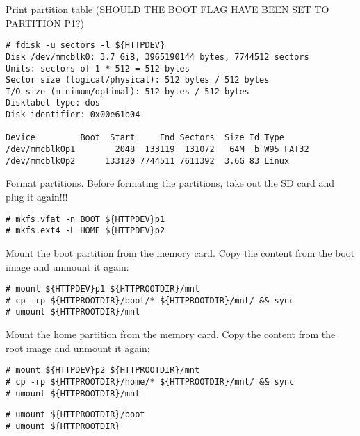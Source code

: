 Print partition table (SHOULD THE BOOT FLAG HAVE BEEN SET TO PARTITION P1?)
\begin{lstlisting}[]
# fdisk -u sectors -l ${HTTPDEV}
Disk /dev/mmcblk0: 3.7 GiB, 3965190144 bytes, 7744512 sectors
Units: sectors of 1 * 512 = 512 bytes
Sector size (logical/physical): 512 bytes / 512 bytes
I/O size (minimum/optimal): 512 bytes / 512 bytes
Disklabel type: dos
Disk identifier: 0x00e61b04

Device         Boot  Start     End Sectors  Size Id Type
/dev/mmcblk0p1        2048  133119  131072   64M  b W95 FAT32
/dev/mmcblk0p2      133120 7744511 7611392  3.6G 83 Linux
\end{lstlisting}
\FloatBarrier
\vspace{-5mm}

Format partitions. Before formating the partitions, take out the SD card
and plug it again!!!
\begin{lstlisting}[]
# mkfs.vfat -n BOOT ${HTTPDEV}p1
# mkfs.ext4 -L HOME ${HTTPDEV}p2
\end{lstlisting}
\FloatBarrier
\vspace{-5mm}

Mount the boot partition from the memory card. Copy the content from the
boot image and unmount it again:
\begin{lstlisting}[]
# mount ${HTTPDEV}p1 ${HTTPROOTDIR}/mnt
# cp -rp ${HTTPROOTDIR}/boot/* ${HTTPROOTDIR}/mnt/ && sync
# umount ${HTTPROOTDIR}/mnt
\end{lstlisting}
\FloatBarrier
\vspace{-5mm}

Mount the home partition from the memory card. Copy the content from the
root image and unmount it again:
\begin{lstlisting}[]
# mount ${HTTPDEV}p2 ${HTTPROOTDIR}/mnt
# cp -rp ${HTTPROOTDIR}/home/* ${HTTPROOTDIR}/mnt/ && sync
# umount ${HTTPROOTDIR}/mnt
\end{lstlisting}
\FloatBarrier
\vspace{-5mm}


\begin{lstlisting}[]
# umount ${HTTPROOTDIR}/boot
# umount ${HTTPROOTDIR}
\end{lstlisting}
\FloatBarrier
\vspace{-5mm}




